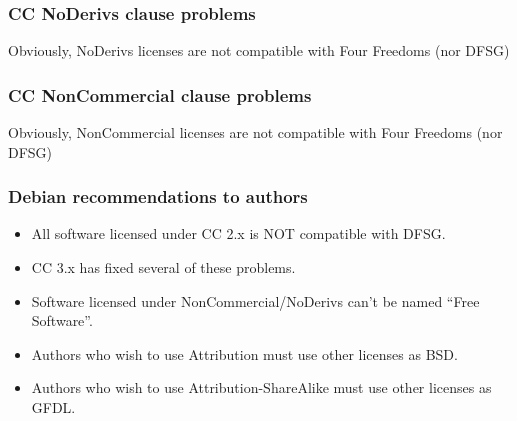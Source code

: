 
\begin{frame}
\frametitle{CC NoDerivs clause problems}

\LARGE{Obviously, NoDerivs licenses are not compatible with Four Freedoms (nor DFSG)}

\end{frame}


\begin{frame}
\frametitle{CC NonCommercial clause problems}

\LARGE{Obviously, NonCommercial licenses are not compatible with Four Freedoms (nor DFSG)}

\end{frame}



\begin{frame}
\frametitle{Debian recommendations to authors}

\begin{itemize}
\item All software licensed under CC 2.x is NOT compatible with DFSG. 
\item CC 3.x has fixed several of these problems.
\item Software licensed under NonCommercial/NoDerivs can't be named ``Free Software''.
\item Authors who wish to use Attribution must use other licenses as BSD.
\item Authors who wish to use Attribution-ShareAlike must use other licenses as GFDL.
\end{itemize}

\end{frame}





